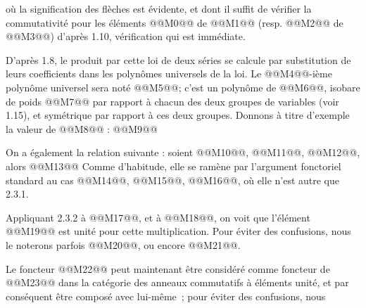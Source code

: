 
où la
signification des flèches est évidente, et dont il suffit de vérifier la commutativité pour les éléments @@M0@@ de @@M1@@ (resp. @@M2@@ de @@M3@@) d'après 1.10, vérification qui est immédiate.

D'après 1.8, le produit par cette loi de deux séries se calcule par substitution de leurs coefficients dans les polynômes universels de la loi. Le @@M4@@-ième polynôme universel sera noté @@M5@@; c'est un polynôme de @@M6@@, isobare de poids @@M7@@ par rapport à chacun des deux groupes de variables (voir 1.15), et symétrique par rapport à ces deux groupes. Donnons à titre d'exemple la valeur de @@M8@@ :
@@M9@@

On a également la relation suivante : soient @@M10@@, @@M11@@, @@M12@@, alors
@@M13@@
Comme d'habitude, elle se ramène par l'argument fonctoriel standard au cas @@M14@@, @@M15@@, @@M16@@, où elle n'est autre que 2.3.1.

Appliquant 2.3.2 à @@M17@@, et à @@M18@@, on voit que l'élément @@M19@@ est unité pour cette multiplication. Pour éviter des confusions, nous le noterons parfois @@M20@@, ou encore @@M21@@.

Le foncteur @@M22@@ peut maintenant être considéré comme foncteur de @@M23@@ dans la catégorie des anneaux commutatifs à éléments unité, et par conséquent être composé avec lui-même~; pour éviter des confusions,
nous 
